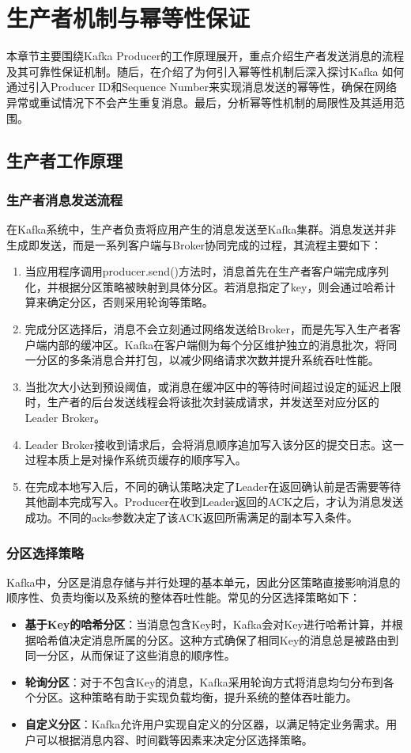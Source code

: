 \section{生产者机制与幂等性保证}
本章节主要围绕Kafka Producer的工作原理展开，重点介绍生产者发送消息的流程及其可靠性保证机制。随后，在介绍了为何引入幂等性机制后深入探讨Kafka
如何通过引入Producer ID和Sequence Number来实现消息发送的幂等性，确保在网络异常或重试情况下不会产生重复消息。最后，分析幂等性机制的局限性及其适用范围。
\subsection{生产者工作原理}
    \subsubsection{生产者消息发送流程}
在Kafka系统中，生产者负责将应用产生的消息发送至Kafka集群。消息发送并非生成即发送，而是一系列客户端与Broker协同完成的过程，其流程主要如下：
\begin{enumerate}
    \item 当应用程序调用producer.send()方法时，消息首先在生产者客户端完成序列化，并根据分区策略被映射到具体分区。若消息指定了key，则会通过哈希计算来确定分区，否则采用轮询等策略。
    \item 完成分区选择后，消息不会立刻通过网络发送给Broker，而是先写入生产者客户端内部的缓冲区。Kafka在客户端侧为每个分区维护独立的消息批次，将同一分区的多条消息合并打包，以减少网络请求次数并提升系统吞吐性能。
    \item 当批次大小达到预设阈值，或消息在缓冲区中的等待时间超过设定的延迟上限时，生产者的后台发送线程会将该批次封装成请求，并发送至对应分区的Leader Broker。
    \item Leader Broker接收到请求后，会将消息顺序追加写入该分区的提交日志。这一过程本质上是对操作系统页缓存的顺序写入。
    \item 在完成本地写入后，不同的确认策略决定了Leader在返回确认前是否需要等待其他副本完成写入。Producer在收到Leader返回的ACK之后，才认为消息发送成功。不同的acks参数决定了该ACK返回所需满足的副本写入条件。
\end{enumerate}
    \subsubsection{分区选择策略}
Kafka中，分区是消息存储与并行处理的基本单元，因此分区策略直接影响消息的顺序性、负责均衡以及系统的整体吞吐性能。常见的分区选择策略如下：
\begin{itemize}
    \item \textbf{基于Key的哈希分区}：当消息包含Key时，Kafka会对Key进行哈希计算，并根据哈希值决定消息所属的分区。这种方式确保了相同Key的消息总是被路由到同一分区，从而保证了这些消息的顺序性。
    \item \textbf{轮询分区}：对于不包含Key的消息，Kafka采用轮询方式将消息均匀分布到各个分区。这种策略有助于实现负载均衡，提升系统的整体吞吐能力。
    \item \textbf{自定义分区}：Kafka允许用户实现自定义的分区器，以满足特定业务需求。用户可以根据消息内容、时间戳等因素来决定分区选择策略。
\end{itemize}
